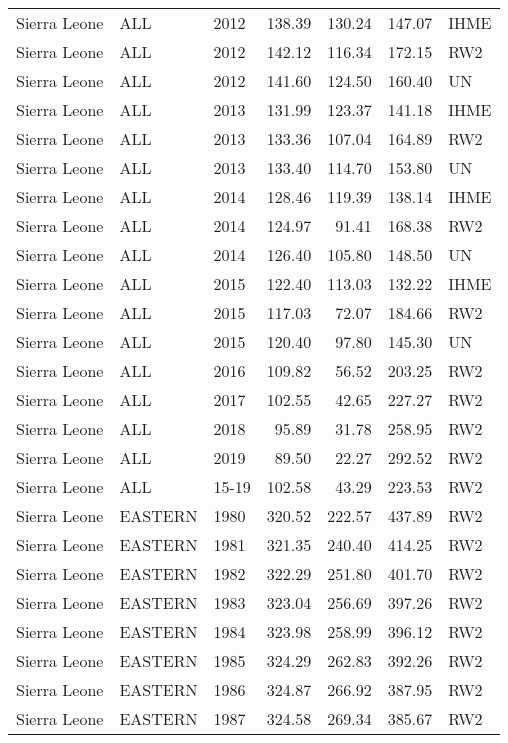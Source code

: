 \begin{longtable}{lllrrrl}
  Sierra Leone & ALL & 2012 & 138.39 & 130.24 & 147.07 & IHME \\ 
  Sierra Leone & ALL & 2012 & 142.12 & 116.34 & 172.15 & RW2 \\ 
  Sierra Leone & ALL & 2012 & 141.60 & 124.50 & 160.40 & UN \\ 
  Sierra Leone & ALL & 2013 & 131.99 & 123.37 & 141.18 & IHME \\ 
  Sierra Leone & ALL & 2013 & 133.36 & 107.04 & 164.89 & RW2 \\ 
  Sierra Leone & ALL & 2013 & 133.40 & 114.70 & 153.80 & UN \\ 
  Sierra Leone & ALL & 2014 & 128.46 & 119.39 & 138.14 & IHME \\ 
  Sierra Leone & ALL & 2014 & 124.97 & 91.41 & 168.38 & RW2 \\ 
  Sierra Leone & ALL & 2014 & 126.40 & 105.80 & 148.50 & UN \\ 
  Sierra Leone & ALL & 2015 & 122.40 & 113.03 & 132.22 & IHME \\ 
  Sierra Leone & ALL & 2015 & 117.03 & 72.07 & 184.66 & RW2 \\ 
  Sierra Leone & ALL & 2015 & 120.40 & 97.80 & 145.30 & UN \\ 
  Sierra Leone & ALL & 2016 & 109.82 & 56.52 & 203.25 & RW2 \\ 
  Sierra Leone & ALL & 2017 & 102.55 & 42.65 & 227.27 & RW2 \\ 
  Sierra Leone & ALL & 2018 & 95.89 & 31.78 & 258.95 & RW2 \\ 
  Sierra Leone & ALL & 2019 & 89.50 & 22.27 & 292.52 & RW2 \\ 
  Sierra Leone & ALL & 15-19 & 102.58 & 43.29 & 223.53 & RW2 \\ 
  Sierra Leone & EASTERN & 1980 & 320.52 & 222.57 & 437.89 & RW2 \\ 
  Sierra Leone & EASTERN & 1981 & 321.35 & 240.40 & 414.25 & RW2 \\ 
  Sierra Leone & EASTERN & 1982 & 322.29 & 251.80 & 401.70 & RW2 \\ 
  Sierra Leone & EASTERN & 1983 & 323.04 & 256.69 & 397.26 & RW2 \\ 
  Sierra Leone & EASTERN & 1984 & 323.98 & 258.99 & 396.12 & RW2 \\ 
  Sierra Leone & EASTERN & 1985 & 324.29 & 262.83 & 392.26 & RW2 \\ 
  Sierra Leone & EASTERN & 1986 & 324.87 & 266.92 & 387.95 & RW2 \\ 
  Sierra Leone & EASTERN & 1987 & 324.58 & 269.34 & 385.67 & RW2 \\ 

\end{longtable}
